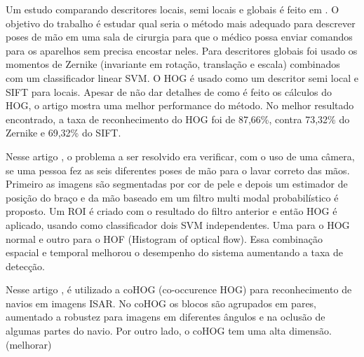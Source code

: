Um estudo comparando descritores locais, semi locais e globais é feito em \cite{collumeau2011hand}. O objetivo do trabalho é estudar qual seria o método mais adequado para descrever poses de mão em uma sala de cirurgia para que o médico possa enviar comandos para os aparelhos sem precisa encostar neles. Para descritores globais foi usado os momentos de Zernike (invariante em rotação, translação e escala) combinados com um classificador linear SVM. O HOG é usado como um descritor semi local e SIFT para locais. Apesar de não dar detalhes de como é feito os cálculos do HOG, o artigo mostra uma melhor performance do método. No melhor resultado encontrado, a taxa de reconhecimento do HOG foi de 87,66\%, contra 73,32\% do Zernike e 69,32\% do SIFT.

Nesse artigo \cite{llorca2011vision}, o problema a ser resolvido era verificar, com o uso de uma câmera, se uma pessoa  fez as seis diferentes poses de mão para o lavar correto das mãos. Primeiro as imagens são segmentadas por cor de pele e depois um estimador de posição do braço e da mão baseado em um filtro multi modal probabilístico é proposto. Um ROI é criado com o resultado do filtro anterior e então HOG é aplicado, usando como classificador dois SVM independentes. Uma para o HOG normal e outro para o HOF (Histogram of optical flow). Essa combinação espacial e temporal melhorou o desempenho do sistema aumentando a taxa de detecção.

Nesse artigo \cite{kawahara2012automatic}, é utilizado a coHOG (co-occurence HOG) para reconhecimento de navios em imagens ISAR. No coHOG os blocos são agrupados em pares, aumentado a robustez para imagens em diferentes ângulos e na oclusão de algumas partes do navio. Por outro lado, o coHOG tem uma alta dimensão. (melhorar)


